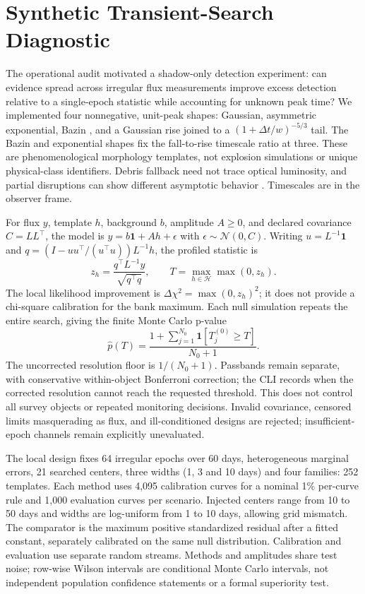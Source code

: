 \section{Synthetic Transient-Search Diagnostic}
\label{sec:synthetic-search}

The operational audit motivated a shadow-only detection experiment: can evidence
spread across irregular flux measurements improve excess detection relative to a
single-epoch statistic while accounting for unknown peak time? We implemented four
nonnegative, unit-peak shapes: Gaussian, asymmetric exponential, Bazin
\citep{bazin2009}, and a Gaussian rise joined to a $(1+\Delta t/w)^{-5/3}$ tail.
The Bazin and exponential shapes fix the fall-to-rise timescale ratio at three.
These are phenomenological morphology templates, not explosion simulations or
unique physical-class identifiers. Debris fallback need not trace optical luminosity,
and partial disruptions can show different asymptotic behavior \citep{miles2020}.
Timescales are in the observer frame.

For flux $y$, template $h$, background $b$, amplitude $A\geq0$, and declared
covariance $C=LL^\top$, the model is $y=b\mathbf{1}+Ah+\epsilon$ with
$\epsilon\sim\mathcal{N}(0,C)$. Writing $u=L^{-1}\mathbf{1}$ and
$q=(I-uu^\top/(u^\top u))L^{-1}h$, the profiled statistic is
\begin{equation}
z_h=\frac{q^\top L^{-1}y}{\sqrt{q^\top q}},\qquad
T=\max_{h\in\mathcal H}\max(0,z_h).
\end{equation}
The local likelihood improvement is $\Delta\chi^2=\max(0,z_h)^2$; it does not
provide a chi-square calibration for the bank maximum. Each null simulation
repeats the entire search, giving the finite Monte Carlo p-value
\begin{equation}
\widehat p(T)=\frac{1+\sum_{j=1}^{N_0}\mathbf{1}[T_j^{(0)}\geq T]}{N_0+1}.
\end{equation}
The uncorrected resolution floor is $1/(N_0+1)$. Passbands remain separate, with conservative within-object Bonferroni correction; the CLI records when the corrected resolution cannot reach the requested threshold.
This does not control all survey objects or repeated monitoring decisions.
Invalid covariance, censored limits masquerading as flux, and ill-conditioned
designs are rejected; insufficient-epoch channels remain explicitly unevaluated.

The local design fixes 64 irregular epochs over 60 days, heterogeneous marginal
errors, 21 searched centers, three widths (1, 3 and 10 days) and four families:
252 templates. Each method uses 4,095 calibration curves for a nominal 1\%
per-curve rule and 1,000 evaluation curves per scenario. Injected centers range
from 10 to 50 days and widths are log-uniform from 1 to 10 days, allowing grid
mismatch. The comparator is the maximum positive standardized residual after a
fitted constant, separately calibrated on the same null distribution. Calibration
and evaluation use separate random streams. Methods and amplitudes share test
noise; row-wise Wilson intervals are conditional Monte Carlo intervals, not
independent population confidence statements or a formal superiority test.

